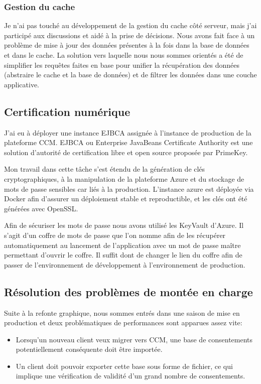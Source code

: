 \documentclass[12pt, a4paper]{report}
\newcommand\tab[1][1cm]{\hspace*{#1}}
\begin{document}
\subsubsection{Gestion du cache}
Je n'ai pas touché au développement de la gestion du cache côté serveur, mais j'ai participé aux discussions et aidé à la prise de décisions.
Nous avons fait face à un problème de mise à jour des données présentes à la fois dans la base de données et dans le cache. La solution vers laquelle nous nous sommes orientés a été de simplifier les requêtes faites en base pour unifier la récupération des données (abstraire le cache et la base de données) et de filtrer les données dans une couche applicative.

\subsection{Certification numérique}
J'ai eu à déployer une instance EJBCA assignée à l'instance de production de la plateforme CCM.\newline
EJBCA ou Enterprise JavaBeans Certificate Authority est une solution d'autorité de certification libre et open source proposée par PrimeKey.\newline

Mon travail dans cette tâche s'est étendu de la génération de clés cryptographiques, à la manipulation de la plateforme Azure et du stockage de mots de passe sensibles car liés à la production.
L'instance azure est déployée via Docker afin d'assurer un déploiement stable et reproductible, et les clés ont été générées avec OpenSSL.\newline

Afin de sécuriser les mots de passe nous avons utilisé les KeyVault d'Azure. Il s'agit d'un coffre de mots de passe que l'on nomme afin de les récupérer automatiquement au lancement de l'application avec un mot de passe maître permettant d'ouvrir le coffre. Il suffit dont de changer le lien du coffre afin de passer de l'environnement de développement à l'environnement de production.

\subsection{Résolution des problèmes de montée en charge}
\tab{} Suite à la refonte graphique, nous sommes entrés dans une saison de mise en production et deux problématiques de performances sont apparues assez vite:
\begin{itemize}
    \item Lorsqu'un nouveau client veux migrer vers CCM, une base de consentements potentiellement conséquente doit être importée.
    \item Un client doit pouvoir exporter cette base sous forme de fichier, ce qui implique une vérification de validité d'un grand nombre de consentements.
\end{itemize}
\end{document}
